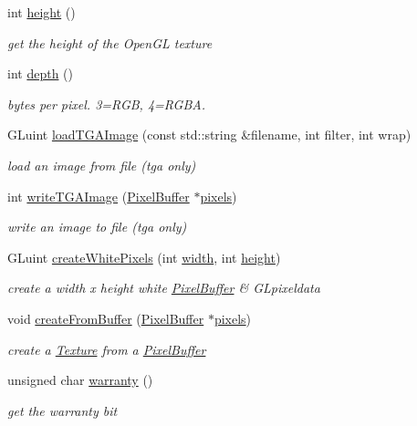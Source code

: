 \begin{DoxyCompactItemize}
int \hyperlink{class_texture_a313a22ab82d389b2cb36fdb5cff40ecd}{height} ()
\begin{DoxyCompactList}\small\item\em get the height of the Open\+GL texture \end{DoxyCompactList}\item 
int \hyperlink{class_texture_a9e69c0d8b6e28dad8a9bb0ceb0af5da7}{depth} ()
\begin{DoxyCompactList}\small\item\em bytes per pixel. 3=R\+GB, 4=R\+G\+BA. \end{DoxyCompactList}\item 
G\+Luint \hyperlink{class_texture_a55975532738a6fab41ef8ad793d6a0ad}{load\+T\+G\+A\+Image} (const std\+::string \&filename, int filter, int wrap)
\begin{DoxyCompactList}\small\item\em load an image from file (tga only) \end{DoxyCompactList}\item 
int \hyperlink{class_texture_afe34cd10fffd2afbd2d9748f2a21acbb}{write\+T\+G\+A\+Image} (\hyperlink{struct_pixel_buffer}{Pixel\+Buffer} $\ast$\hyperlink{class_texture_a6eb92d5d1c82b77fd2ced5c1b767dca1}{pixels})
\begin{DoxyCompactList}\small\item\em write an image to file (tga only) \end{DoxyCompactList}\item 
G\+Luint \hyperlink{class_texture_a4efabecf7657384b7b6cb4e6f1b8a62f}{create\+White\+Pixels} (int \hyperlink{class_texture_a692f72a0e68a9ffa63d1a2e39644e7df}{width}, int \hyperlink{class_texture_a313a22ab82d389b2cb36fdb5cff40ecd}{height})
\begin{DoxyCompactList}\small\item\em create a width x height white \hyperlink{struct_pixel_buffer}{Pixel\+Buffer} \& G\+Lpixeldata \end{DoxyCompactList}\item 
void \hyperlink{class_texture_a2766d07d7c01aad338b457ae9d844e71}{create\+From\+Buffer} (\hyperlink{struct_pixel_buffer}{Pixel\+Buffer} $\ast$\hyperlink{class_texture_a6eb92d5d1c82b77fd2ced5c1b767dca1}{pixels})
\begin{DoxyCompactList}\small\item\em create a \hyperlink{class_texture}{Texture} from a \hyperlink{struct_pixel_buffer}{Pixel\+Buffer} \end{DoxyCompactList}\item 
unsigned char \hyperlink{class_texture_a13c3996f10cc236ee21b517da8501973}{warranty} ()
\begin{DoxyCompactList}\small\item\em get the warranty bit \end{DoxyCompactList}\end{DoxyCompactItemize}


